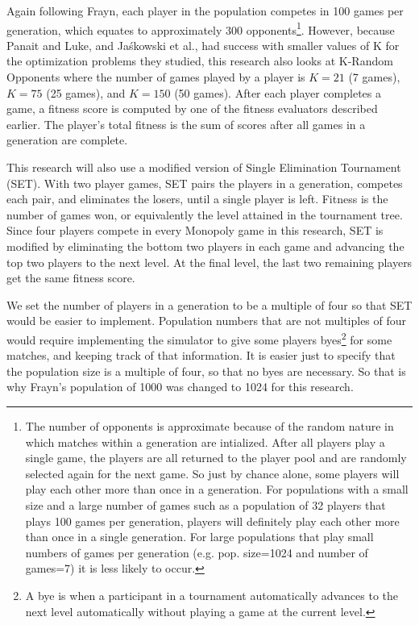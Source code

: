 Again following Frayn, each player in the population competes in 100 games per
generation, which equates to approximately 300 opponents\footnote{The number of
opponents is approximate because of the random nature in which matches within a
generation are intialized. After all players play a single game, the players are
all returned to the player pool and are randomly selected again for the next
game. So just by chance alone, some players will play each other more than once
in a generation. For populations with a small size and a large number of games
such as a population of 32 players that plays 100 games per generation, players
will definitely play each other more than once in a single generation. For large
populations that play small numbers of games per generation (e.g. pop. size=1024
and number of games=7) it is less likely to occur.}. However, because Panait
and Luke, and Ja\'{s}kowski et al., had success with smaller values of K for the
optimization problems they studied, this research also looks at K-Random
Opponents where the number of games played by a player is \(K=21\) (7 games),
\(K=75\) (25 games), and \(K=150\) (50 games). After each player completes a
game, a fitness score is computed by one of the fitness evaluators described
earlier. The player's total fitness is the sum of scores after all games in a
generation are complete.

This research will also use a modified version of Single Elimination Tournament
(SET). With two player games, SET pairs the players in a generation, competes
each pair, and eliminates the losers, until a single player is left.
Fitness is the number of games won, or equivalently the level attained in the
tournament tree. Since four players compete in every Monopoly game in this
research, SET is modified by eliminating the bottom two players in each game and
advancing the top two players to the next level. At the final level, the last
two remaining players get the same fitness score.

We set the number of players in a generation to be a multiple of four so that
SET would be easier to implement. Population numbers that are not multiples of
four would require implementing the simulator to give some players
byes\footnote{A bye is when a participant in a tournament automatically
advances to the next level automatically without playing a game at the current
level.} for some matches, and keeping track of that information. It is easier
just to specify that the population size is a multiple of four, so that no byes
are necessary. So that is why Frayn's population of 1000 was changed to 1024 for
this research.

